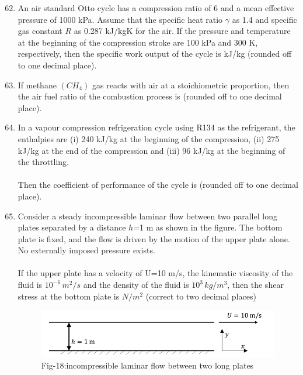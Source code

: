 \documentclass[journal]{IEEEtran}
\theoremstyle{remark}
\begin{document}
\begin{enumerate}[itemsep=1em]
\setcounter{enumi}{61}
\item An air standard Otto cycle has a compression ratio of 6 and a mean effective pressure of 1000 kPa. Assume that the specific heat ratio $\gamma$ as 1.4 and specific gas constant $R$ as 0.287 kJ/kgK for the air. If the pressure and temperature at the beginning of the compression stroke are 100 kPa and 300 K, respectively, then the specific work output of the cycle is \underline{\hspace{2cm}} kJ/kg (rounded off to one decimal 
place). 
\end{enumerate}

\begin{enumerate}[itemsep=1em]
\setcounter{enumi}{62}
\item If methane $(CH_4)$ gas reacts with air at a stoichiometric proportion, then the air fuel ratio of the combustion process is \underline{\hspace{1cm}} (rounded off to one decimal place). 
\end{enumerate}

\begin{enumerate}[itemsep=1em]
\setcounter{enumi}{63}
\item In a vapour compression refrigeration cycle using R134 as the refrigerant, the enthalpies are (i) 240 kJ/kg at the beginning of the compression, (ii) 275 kJ/kg at the end of the compression and (iii) 96 kJ/kg at the beginning of the throttling. \\
\\
Then the coefficient of performance of the cycle is \underline{\hspace{2cm}} (rounded off to one decimal place). 
\end{enumerate}

\begin{enumerate}[itemsep=1em]
\setcounter{enumi}{64}
\item Consider a steady incompressible laminar flow between two parallel long plates separated by a distance $h$=1 m as shown in the figure. The bottom plate is fixed, and the flow is driven by the motion of the upper plate alone. No externally imposed pressure exists. \\
\\
If the upper plate has a velocity of U=10 m/s, the kinematic viscosity of the fluid is $10^{-6}\, m^2/s$ and the density of the fluid is $10^3 \,kg/m^3$, then the shear stress at the bottom plate is \underline{\hspace{1cm}} $N/m^2$ (correct to two decimal places) 
\begin{figure}[H]
    \centering
    \includegraphics[width=0.4\columnwidth]{figs/fig-18.jpeg}
    \caption*{Fig-18:incompressible laminar flow between two long plates}
    \label{fig-17}
\end{figure}
\end{enumerate}
\end{document}
